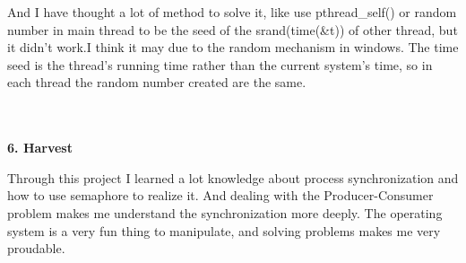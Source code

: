 \documentclass[12pt,a4paper]{article}
\begin{document}
And I have thought a lot of method to solve it, like use pthread\_self() or random number in main thread to be the seed of the srand(time(\&t)) of other thread, but it didn't work.I think it may due to the random mechanism in windows. The time seed is the thread's running time rather than the current system's time, so in each thread the random number created are the same.  

\begin{large}
~\\
~\\
\textbf{6. Harvest}
\end{large}

Through this project I learned a lot knowledge about process synchronization and how to use semaphore to realize it. And dealing with the Producer-Consumer problem makes me understand the synchronization more deeply. The operating system is a very fun thing to manipulate, and solving problems makes me very proudable.
\end{document}
